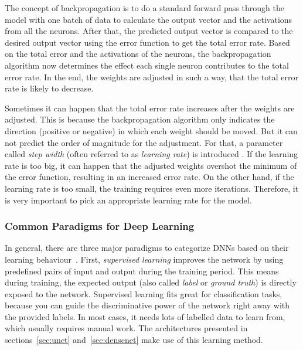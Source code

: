 The concept of backpropagation is to do a standard forward pass through the model with one batch of data to calculate the output vector and the activations from all the neurons. After that, the predicted output vector is compared to the desired output vector using the error function to get the total error rate. Based on the total error and the activations of the neurons, the backpropagation algorithm now determines the effect each single neuron contributes to the total error rate. In the end, the weights are adjusted in such a way, that the total error rate is likely to decrease.

Sometimes it can happen that the total error rate increases after the weights are adjusted. This is because the backpropagation algorithm only indicates the direction (positive or negative) in which each weight should be moved. But it can not predict the order of magnitude for the adjustment. For that, a parameter called \emph{step width} (often referred to as \emph{learning rate}) is introduced \cite[p.~169]{nn_intro96}. If the learning rate is too big, it can happen that the adjusted weights overshot the minimum of the error function, resulting in an increased error rate. On the other hand, if the learning rate is too small, the training requires even more iterations. Therefore, it is very important to pick an appropriate learning rate for the model.


\subsubsection{Common Paradigms for Deep Learning}
\label{sec:dl_paradigms}
In general, there are three major paradigms to categorize DNNs based on their learning behaviour~\cite[p.~214f]{dlma14}. First, \emph{supervised learning} improves the network by using predefined pairs of input and output during the training period. This means during training, the expected output (also called \emph{label} or \emph{ground truth}) is directly exposed to the network. Supervised learning fits great for classification tasks, because you can guide the discriminative power of the network right away with the provided labels. In most cases, it needs lots of labelled data to learn from, which usually requires manual work. The architectures presented in sections~\ref{sec:unet} and~\ref{sec:densenet} make use of this learning method.

